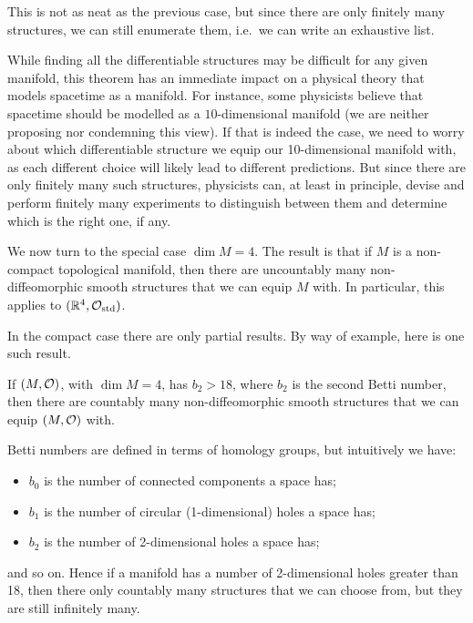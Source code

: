 This is not as neat as the previous case, but since there are only finitely many structures, we can still enumerate them, i.e.\ we can write an exhaustive list.

While finding all the differentiable structures may be difficult for any given manifold, this theorem has an immediate impact on a physical theory that models spacetime as a manifold. For instance, some physicists believe that spacetime should be modelled as a $10$-dimensional manifold (we are neither proposing nor condemning this view). If that is indeed the case, we need to worry about which differentiable structure we equip our 10-dimensional manifold with, as each different choice will likely lead to different predictions. But since there are only finitely many such structures, physicists can, at least in principle, devise and perform finitely many experiments to distinguish between them and determine which is the right one, if any.

We now turn to the special case $\dim M = 4$. The result is that if $M$ is a non-compact topological manifold, then there are uncountably many non-diffeomorphic smooth structures that we can equip $M$ with. In particular, this applies to $(\mathbb{R}^4,\mathcal{O}_\mathrm{std})$.

In the compact case there are only partial results. By way of example, here is one such result.

\bp
If $(M,\mathcal{O})$, with $\dim M = 4$, has $b_2>18$, where $b_2$ is the second Betti number, then there are countably many non-diffeomorphic smooth structures that we can equip $(M,\mathcal{O})$ with. 
\ep

Betti numbers are defined in terms of homology groups, but intuitively we have:
\begin{itemize}
\item $b_0$ is the number of connected components a space has;
\item $b_1$ is the number of circular (1-dimensional) holes a space has;
\item $b_2$ is the number of 2-dimensional holes a space has;
\end{itemize}
and so on. Hence if a manifold has a number of 2-dimensional holes greater than 18, then there only countably many structures that we can choose from, but they are still infinitely many.












